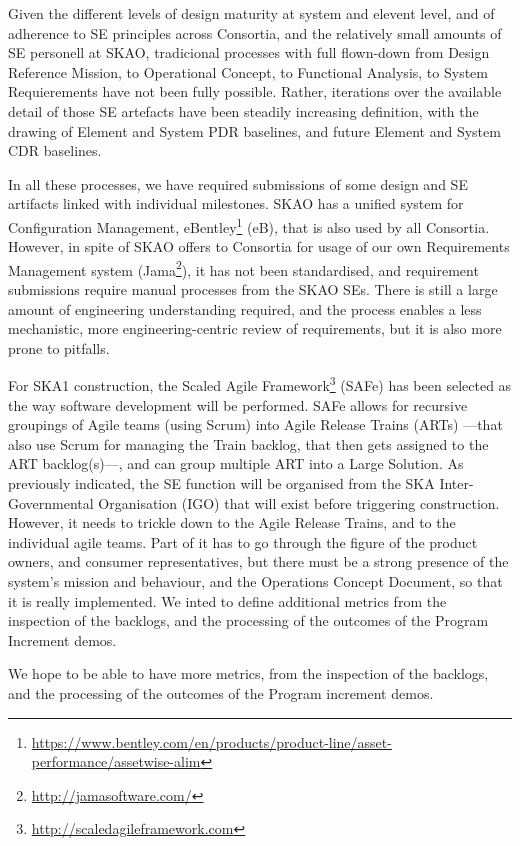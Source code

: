 \documentclass[11pt,twoside]{article}
\begin{document}
Given the different levels of design maturity at system and elevent level, and of adherence to SE principles across Consortia, and the relatively small amounts of SE personell at SKAO, tradicional processes with full flown-down from Design Reference Mission, to Operational Concept, to Functional Analysis, to System Requierements have not been fully possible. Rather, iterations over the available detail of those SE artefacts have been steadily increasing definition, with the drawing of Element and System PDR baselines, and future Element and System CDR baselines.

In all these processes, we have required submissions of some design and SE artifacts linked with individual milestones. SKAO has a unified system for Configuration Management, eBentley\footnote{\url{https://www.bentley.com/en/products/product-line/asset-performance/assetwise-alim}} (eB), that is also used by all Consortia. However, in spite of SKAO offers to Consortia for usage of our own Requirements Management system (Jama\footnote{\url{http://jamasoftware.com/}}), it has not been standardised, and requirement submissions require manual processes from the SKAO SEs. There is still a large amount of engineering understanding required, and the process enables a less mechanistic, more engineering-centric review of requirements, but it is also more prone to pitfalls.

For SKA1 construction, the Scaled Agile Framework\footnote{\url{http://scaledagileframework.com}} (SAFe) has been selected as the way software development will be performed. SAFe allows for recursive groupings of Agile teams (using Scrum) into Agile Release Trains (ARTs) ---that also use Scrum for managing the Train backlog, that then gets assigned to the ART backlog(s)---, and can group multiple ART into a Large Solution.
As previously indicated, the SE function will be organised from the SKA Inter-Governmental Organisation (IGO) that will exist before triggering construction. However, it needs to trickle down to the Agile Release Trains, and to the individual agile teams.	
Part of it has to go through the figure of the product owners, and consumer representatives, but there must be a strong presence of the system's mission and behaviour, and the Operations Concept Document, so that it is really implemented. We inted to define additional metrics from the inspection of the backlogs, and the processing of the outcomes of the Program Increment demos.	

We hope to be able to have more metrics, from the inspection of the backlogs, and the processing of the outcomes of the Program increment demos.	
\end{document}
